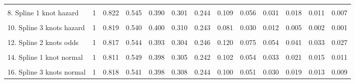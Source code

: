 \documentclass[]{article}
\begin{document}
{\begin{tabular}{lrrrrrrrrrrrr}
\cellcolor{gray!6}{7. Generalised Gamma} & \cellcolor{gray!6}{1} & \cellcolor{gray!6}{0.810} & \cellcolor{gray!6}{0.555} & \cellcolor{gray!6}{0.399} & \cellcolor{gray!6}{0.302} & \cellcolor{gray!6}{0.237} & \cellcolor{gray!6}{0.100} & \cellcolor{gray!6}{0.057} & \cellcolor{gray!6}{0.037} & \cellcolor{gray!6}{0.026} & \cellcolor{gray!6}{0.019} & \cellcolor{gray!6}{0.015}\\
8. Spline 1 knot hazard & 1 & 0.822 & 0.545 & 0.390 & 0.301 & 0.244 & 0.109 & 0.056 & 0.031 & 0.018 & 0.011 & 0.007\\
\cellcolor{gray!6}{9. Spline 2 knots hazard} & \cellcolor{gray!6}{1} & \cellcolor{gray!6}{0.817} & \cellcolor{gray!6}{0.546} & \cellcolor{gray!6}{0.396} & \cellcolor{gray!6}{0.305} & \cellcolor{gray!6}{0.243} & \cellcolor{gray!6}{0.096} & \cellcolor{gray!6}{0.043} & \cellcolor{gray!6}{0.021} & \cellcolor{gray!6}{0.010} & \cellcolor{gray!6}{0.005} & \cellcolor{gray!6}{0.003}\\
10. Spline 3 knots hazard & 1 & 0.819 & 0.540 & 0.400 & 0.310 & 0.243 & 0.081 & 0.030 & 0.012 & 0.005 & 0.002 & 0.001\\
\cellcolor{gray!6}{11. Spline 1 knot odds} & \cellcolor{gray!6}{1} & \cellcolor{gray!6}{0.820} & \cellcolor{gray!6}{0.542} & \cellcolor{gray!6}{0.390} & \cellcolor{gray!6}{0.303} & \cellcolor{gray!6}{0.248} & \cellcolor{gray!6}{0.127} & \cellcolor{gray!6}{0.082} & \cellcolor{gray!6}{0.060} & \cellcolor{gray!6}{0.047} & \cellcolor{gray!6}{0.038} & \cellcolor{gray!6}{0.032}\\
12. Spline 2 knots odds & 1 & 0.817 & 0.544 & 0.393 & 0.304 & 0.246 & 0.120 & 0.075 & 0.054 & 0.041 & 0.033 & 0.027\\
\cellcolor{gray!6}{13. Spline 3 knots odds} & \cellcolor{gray!6}{1} & \cellcolor{gray!6}{0.818} & \cellcolor{gray!6}{0.542} & \cellcolor{gray!6}{0.398} & \cellcolor{gray!6}{0.308} & \cellcolor{gray!6}{0.246} & \cellcolor{gray!6}{0.110} & \cellcolor{gray!6}{0.065} & \cellcolor{gray!6}{0.044} & \cellcolor{gray!6}{0.033} & \cellcolor{gray!6}{0.026} & \cellcolor{gray!6}{0.021}\\
14. Spline 1 knot normal & 1 & 0.811 & 0.549 & 0.398 & 0.305 & 0.242 & 0.102 & 0.054 & 0.033 & 0.021 & 0.015 & 0.011\\
\cellcolor{gray!6}{15. Spline 2 knots normal} & \cellcolor{gray!6}{1} & \cellcolor{gray!6}{0.815} & \cellcolor{gray!6}{0.546} & \cellcolor{gray!6}{0.392} & \cellcolor{gray!6}{0.303} & \cellcolor{gray!6}{0.245} & \cellcolor{gray!6}{0.113} & \cellcolor{gray!6}{0.065} & \cellcolor{gray!6}{0.042} & \cellcolor{gray!6}{0.029} & \cellcolor{gray!6}{0.021} & \cellcolor{gray!6}{0.016}\\
16. Spline 3 knots normal & 1 & 0.818 & 0.541 & 0.398 & 0.308 & 0.244 & 0.100 & 0.051 & 0.030 & 0.019 & 0.013 & 0.009\\
\bottomrule
\end{tabular}}
\end{document}
